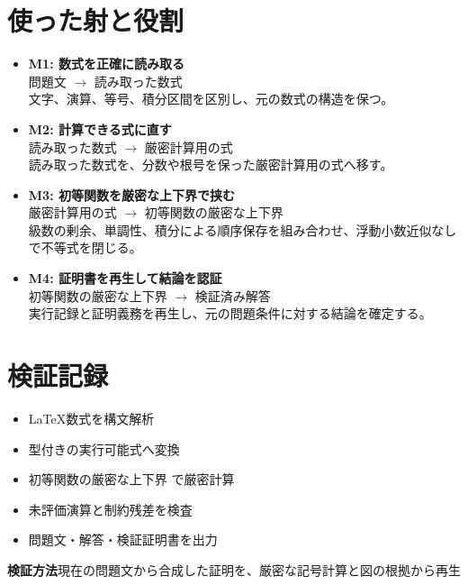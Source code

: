 \documentclass[uplatex,dvipdfmx,11pt]{jsarticle}
\begin{document}
\section*{使った射と役割}
\begin{itemize}
\item \textbf{M1: 数式を正確に読み取る}\\
問題文
$\longrightarrow$
読み取った数式\\
文字、演算、等号、積分区間を区別し、元の数式の構造を保つ。
\item \textbf{M2: 計算できる式に直す}\\
読み取った数式
$\longrightarrow$
厳密計算用の式\\
読み取った数式を、分数や根号を保った厳密計算用の式へ移す。
\item \textbf{M3: 初等関数を厳密な上下界で挟む}\\
厳密計算用の式
$\longrightarrow$
初等関数の厳密な上下界\\
級数の剰余、単調性、積分による順序保存を組み合わせ、浮動小数近似なしで不等式を閉じる。
\item \textbf{M4: 証明書を再生して結論を認証}\\
初等関数の厳密な上下界
$\longrightarrow$
検証済み解答\\
実行記録と証明義務を再生し、元の問題条件に対する結論を確定する。
\end{itemize}




\section*{検証記録}
\begin{itemize}
\item LaTeX数式を構文解析
\item 型付きの実行可能式へ変換
\item 初等関数の厳密な上下界 で厳密計算
\item 未評価演算と制約残差を検査
\item 問題文・解答・検証証明書を出力
\end{itemize}
\noindent\textbf{検証方法}\quad 現在の問題文から合成した証明を、厳密な記号計算と図の根拠から再生
\par{}
\end{document}
